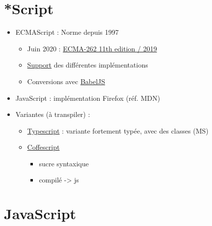 \hypertarget{script}{%
\section{*Script}\label{script}}

\begin{itemize}
\tightlist
\item
  ECMAScript : Norme depuis 1997

  \begin{itemize}
  \tightlist
  \item
    Juin 2020 :
    \href{https://www.ecma-international.org/publications/standards/Ecma-262.htm}{ECMA-262
    11th edition / 2019}
  \item
    \href{http://kangax.github.io/compat-table/es2016plus/}{Support} des
    différentes implémentations
  \item
    Conversions avec \href{https://babeljs.io/}{BabelJS}
  \end{itemize}
\item
  JavaScript : implémentation Firefox (réf. MDN)
\item
  Variantes (à transpiler) :

  \begin{itemize}
  \tightlist
  \item
    \href{https://www.typescriptlang.org/}{Typescript} : variante
    fortement typée, avec des classes (MS)
  \item
    \href{http://coffeescript.org/}{Coffescript}

    \begin{itemize}
    \tightlist
    \item
      sucre syntaxique
    \item
      compilé -\textgreater{} js
    \end{itemize}
  \end{itemize}
\end{itemize}

\hypertarget{javascript}{%
\section{JavaScript}\label{javascript}}

